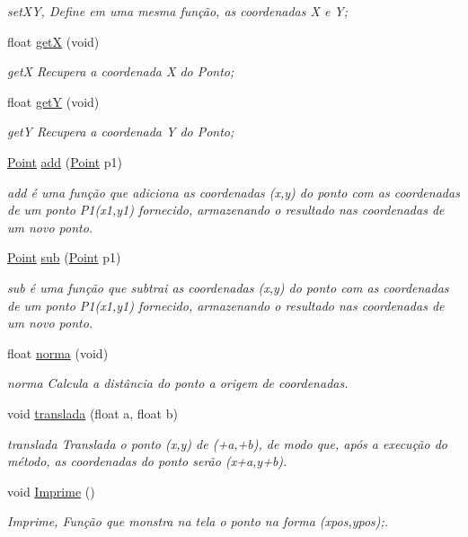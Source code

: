 \begin{DoxyCompactItemize}
\begin{DoxyCompactList}\small\item\em set\+XY, Define em uma mesma função, as coordenadas X e Y; \end{DoxyCompactList}\item 
float \mbox{\hyperlink{class_point_a9aa94b8fd07296e64d304ef3750db113}{getX}} (void)
\begin{DoxyCompactList}\small\item\em getX Recupera a coordenada X do Ponto; \end{DoxyCompactList}\item 
float \mbox{\hyperlink{class_point_a2444daa96871c89614510bc4bfcd19ce}{getY}} (void)
\begin{DoxyCompactList}\small\item\em getY Recupera a coordenada Y do Ponto; \end{DoxyCompactList}\item 
\mbox{\hyperlink{class_point}{Point}} \mbox{\hyperlink{class_point_a9dbea84b07b0a8ec3bbb9e58b3d15899}{add}} (\mbox{\hyperlink{class_point}{Point}} p1)
\begin{DoxyCompactList}\small\item\em add é uma função que adiciona as coordenadas (x,y) do ponto com as coordenadas de um ponto P1(x1,y1) fornecido, armazenando o resultado nas coordenadas de um novo ponto. \end{DoxyCompactList}\item 
\mbox{\hyperlink{class_point}{Point}} \mbox{\hyperlink{class_point_a9cf2c53b0a4e6282a6712824bb4e9b00}{sub}} (\mbox{\hyperlink{class_point}{Point}} p1)
\begin{DoxyCompactList}\small\item\em sub é uma função que subtrai as coordenadas (x,y) do ponto com as coordenadas de um ponto P1(x1,y1) fornecido, armazenando o resultado nas coordenadas de um novo ponto. \end{DoxyCompactList}\item 
float \mbox{\hyperlink{class_point_aa3005a9d97e2cb05624414973a214788}{norma}} (void)
\begin{DoxyCompactList}\small\item\em norma Calcula a distância do ponto a origem de coordenadas. \end{DoxyCompactList}\item 
void \mbox{\hyperlink{class_point_ad9676e36f3444534b609e3c68422239a}{translada}} (float a, float b)
\begin{DoxyCompactList}\small\item\em translada Translada o ponto (x,y) de (+a,+b), de modo que, após a execução do método, as coordenadas do ponto serão (x+a,y+b). \end{DoxyCompactList}\item 
void \mbox{\hyperlink{class_point_a7c50a40a930fb7f3adc0f8e7b60b7d79}{Imprime}} ()
\begin{DoxyCompactList}\small\item\em Imprime, Função que monstra na tela o ponto na forma (xpos,ypos);. \end{DoxyCompactList}\end{DoxyCompactItemize}


